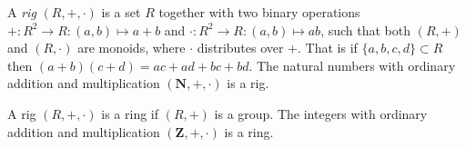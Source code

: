 \documentclass[12pt]{article}
\begin{document}
A \emph{rig} $(R, +, \cdot)$ is a set $R$ together with two binary operations $+:R^2 \to R:(a, b) \mapsto a + b$ and $\cdot:R^2 \to R:(a, b) \mapsto ab$, such that both $(R, +)$ and $(R, \cdot)$ are monoids, where $\cdot$ distributes over $+$. That is if $\{a, b, c, d\} \subset R$ then $(a+b)(c+d) = ac + ad + bc +bd$. The natural numbers with ordinary addition and multiplication $(\mathbf{N}, +, \cdot)$ is a rig.

A rig $(R, +, \cdot)$ is a ring if $(R, +)$ is a group. The integers with ordinary addition and multiplication $(\mathbf{Z}, +, \cdot)$ is a ring.

\end{document}
